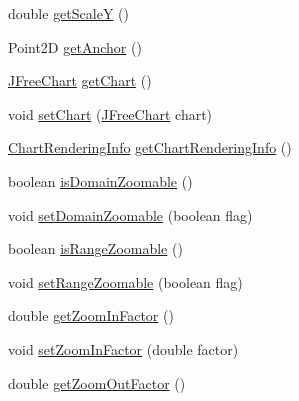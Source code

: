 \begin{DoxyCompactItemize}
\item 
double \mbox{\hyperlink{classorg_1_1jfree_1_1experimental_1_1chart_1_1swt_1_1_chart_composite_a707ad28e329b947386ba4e98a6c0b8c5}{get\+ScaleY}} ()
\item 
Point2D \mbox{\hyperlink{classorg_1_1jfree_1_1experimental_1_1chart_1_1swt_1_1_chart_composite_ae76371c771bab63a4be04abf3eac7dc8}{get\+Anchor}} ()
\item 
\mbox{\hyperlink{classorg_1_1jfree_1_1chart_1_1_j_free_chart}{J\+Free\+Chart}} \mbox{\hyperlink{classorg_1_1jfree_1_1experimental_1_1chart_1_1swt_1_1_chart_composite_aa56d2e4ca08a26de6458fc2467e28878}{get\+Chart}} ()
\item 
void \mbox{\hyperlink{classorg_1_1jfree_1_1experimental_1_1chart_1_1swt_1_1_chart_composite_a35617bfdc4735594e4b29916afab913e}{set\+Chart}} (\mbox{\hyperlink{classorg_1_1jfree_1_1chart_1_1_j_free_chart}{J\+Free\+Chart}} chart)
\item 
\mbox{\hyperlink{classorg_1_1jfree_1_1chart_1_1_chart_rendering_info}{Chart\+Rendering\+Info}} \mbox{\hyperlink{classorg_1_1jfree_1_1experimental_1_1chart_1_1swt_1_1_chart_composite_a6a5a49f6463c01b739035b56360cc018}{get\+Chart\+Rendering\+Info}} ()
\item 
boolean \mbox{\hyperlink{classorg_1_1jfree_1_1experimental_1_1chart_1_1swt_1_1_chart_composite_a1992768486c76edaf61d794b2f72f9c9}{is\+Domain\+Zoomable}} ()
\item 
void \mbox{\hyperlink{classorg_1_1jfree_1_1experimental_1_1chart_1_1swt_1_1_chart_composite_a148f54ae22e93ad0682545a6dc05ed58}{set\+Domain\+Zoomable}} (boolean flag)
\item 
boolean \mbox{\hyperlink{classorg_1_1jfree_1_1experimental_1_1chart_1_1swt_1_1_chart_composite_ac57480fb36bb0ca8f4ad4119fec69337}{is\+Range\+Zoomable}} ()
\item 
void \mbox{\hyperlink{classorg_1_1jfree_1_1experimental_1_1chart_1_1swt_1_1_chart_composite_a2aabcb5879ca00bb5ace5f2267d2ab8f}{set\+Range\+Zoomable}} (boolean flag)
\item 
double \mbox{\hyperlink{classorg_1_1jfree_1_1experimental_1_1chart_1_1swt_1_1_chart_composite_a3cbdc5dd4939115b7ab7460273a5b43e}{get\+Zoom\+In\+Factor}} ()
\item 
void \mbox{\hyperlink{classorg_1_1jfree_1_1experimental_1_1chart_1_1swt_1_1_chart_composite_a6d67355c31636983a53bb8df72042def}{set\+Zoom\+In\+Factor}} (double factor)
\item 
double \mbox{\hyperlink{classorg_1_1jfree_1_1experimental_1_1chart_1_1swt_1_1_chart_composite_acfca8f3fd361b336c10d53ace3bc6251}{get\+Zoom\+Out\+Factor}} ()

\end{DoxyCompactItemize}

